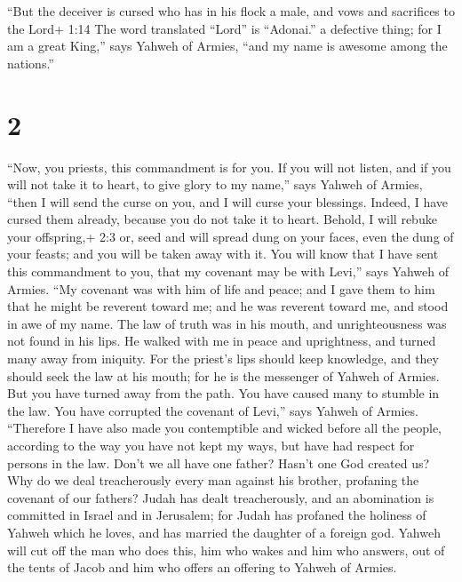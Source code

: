  ``But the deceiver is cursed who has in his flock a male,
and vows and sacrifices to the Lord+ 1:14 The word translated ``Lord''
is ``Adonai.'' a defective thing; for I am a great King,'' says Yahweh
of Armies, ``and my name is awesome among the nations.''

\hypertarget{section-1}{%
\section{2}\label{section-1}}

 ``Now, you priests, this commandment is for you.
 If you will not listen, and if you will not take it to
heart, to give glory to my name,'' says Yahweh of Armies, ``then I will
send the curse on you, and I will curse your blessings. Indeed, I have
cursed them already, because you do not take it to heart. 
Behold, I will rebuke your offspring,+ 2:3 or, seed and will spread dung
on your faces, even the dung of your feasts; and you will be taken away
with it.  You will know that I have sent this commandment to
you, that my covenant may be with Levi,'' says Yahweh of Armies.
 ``My covenant was with him of life and peace; and I gave
them to him that he might be reverent toward me; and he was reverent
toward me, and stood in awe of my name.  The law of truth
was in his mouth, and unrighteousness was not found in his lips. He
walked with me in peace and uprightness, and turned many away from
iniquity.  For the priest's lips should keep knowledge, and
they should seek the law at his mouth; for he is the messenger of Yahweh
of Armies.  But you have turned away from the path. You have
caused many to stumble in the law. You have corrupted the covenant of
Levi,'' says Yahweh of Armies.  ``Therefore I have also made
you contemptible and wicked before all the people, according to the way
you have not kept my ways, but have had respect for persons in the law.
 Don't we all have one father? Hasn't one God created us?
Why do we deal treacherously every man against his brother, profaning
the covenant of our fathers?  Judah has dealt
treacherously, and an abomination is committed in Israel and in
Jerusalem; for Judah has profaned the holiness of Yahweh which he loves,
and has married the daughter of a foreign god.  Yahweh will
cut off the man who does this, him who wakes and him who answers, out of
the tents of Jacob and him who offers an offering to Yahweh of Armies.

